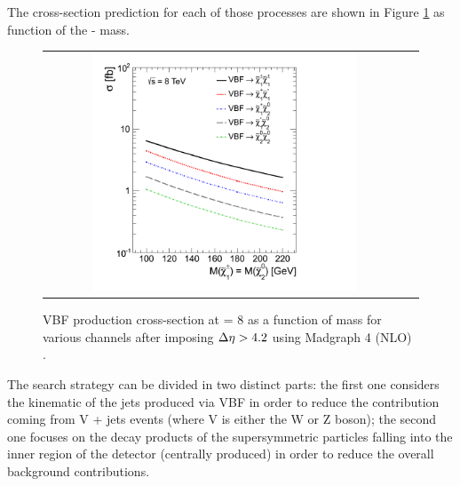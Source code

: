 The cross-section prediction for each of those processes are shown in Figure \ref{fig:VBF_xsec} as function of the \charginomp - \neutralinotwo mass.

\begin{figure}[tbh!]
	\centering
	\begin{tabular}{cc}
		\includegraphics[width=0.75\textwidth]{analysis/pics/VBFXsection.png}
	\end{tabular}
	\caption{VBF production cross-section at \CM = 8 \tev as a function of mass for various channels after imposing \ensuremath{\deltaeta > 4.2} using Madgraph 4 (NLO) \cite{Dutta:2012xe}.}
	\label{fig:VBF_xsec}
\end{figure}

The search strategy can be divided in two distinct parts: the first one considers the kinematic of the jets produced via VBF in order to reduce the contribution coming  from V + jets events (where V is either the W or Z boson); the second one focuses on the decay products of the supersymmetric particles falling into the inner region of the detector (centrally produced) in order to reduce the overall background contributions.


